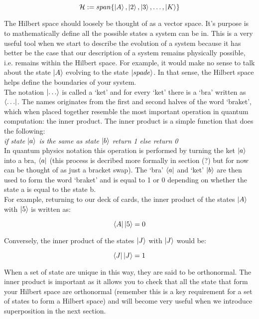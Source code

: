 \begin{equation}
\mathcal{H}:=span\{\left\vert{A}\right\rangle, \left\vert{2}\right\rangle, \left\vert{3}\right\rangle,\ldots ,\left\vert{K}\right\rangle\}
\end{equation}

The Hilbert space should loosely be thought of as a vector space. It's purpose is to mathematically define all the possible states a system can be in. This is a very useful tool when we start to describe the evolution of a system because it has better be the case that our description of a system remains physically possible, i.e. remains within the Hilbert space. For example, it would make no sense to talk about the state $\left\vert{A}\right\rangle$ evolving to the state $\left\vert{spade}\right\rangle$. In that sense, the Hilbert space helps define the boundaries of your system.\\

The notation $\left\vert{\ldots}\right\rangle$ is called a `ket' and for every `ket' there is a `bra' written as $\left\langle{\ldots}\right\vert$. The names originates from the first and second halves of the word `braket', which when placed together resemble the most important operation in quantum computation: the inner product. The inner product is a simple function that does the following:\\

\textit{if state $\left\vert{a}\right\rangle$ is the same as state $\left\vert{b}\right\rangle$ return 1 else return 0}\\

In quantum physics notation this operation is performed by turning the ket $\left\vert{a}\right\rangle$ into a bra, $\left\langle{a}\right\vert$ (this process is decribed more formally in section (?) but for now can be thought of as just a bracket swap). The `bra' $\left\langle{a}\right\vert$ and `ket' $\left\vert{b}\right\rangle$ are then used to form the word `braket' and is equal to 1 or 0 depending on whether the state a is equal to the state b.\\

For example, returning to our deck of cards, the inner product of the states $\left\vert{A}\right\rangle$ with $\left\vert{5}\right\rangle$ is written as:

\begin{equation}
\left\langle{A}\right\vert\left\vert{5}\right\rangle = 0
\end{equation}

Conversely, the inner product of the states $\left\vert{J}\right\rangle$ with $\left\vert{J}\right\rangle$ would be:

\begin{equation}
\left\langle{J}\right\vert\left\vert{J}\right\rangle = 1
\end{equation}

When a set of state are unique in this way, they are said to be orthonormal. The inner product is important as it allows you to check that all the state that form your Hilbert space are orthonormal (remember this is a key requirement for a set of states to form a Hilbert space) and will become very useful when we introduce superposition in the next section.

